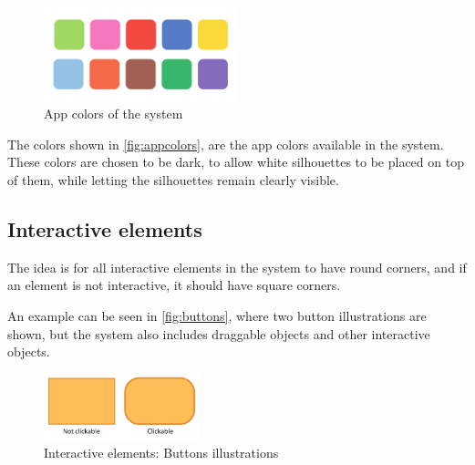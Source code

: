 \begin{figure}[h!]
	\centering
	\includegraphics[width=0.5\textwidth]{gfx/app_colors.pdf}
	\caption{App colors of the \giraf[] system}
	\label{fig:appcolors}
\end{figure}

The colors shown in \autoref{fig:appcolors}, are the app colors available in the \giraf[] system.
These colors are chosen to be dark, to allow white silhouettes to be placed on top of them, while letting the silhouettes remain clearly visible.

\subsection*{Interactive elements}
\label{design:button_design}

The idea is for all interactive elements in the \giraf[] system to have round corners, and if an element is not interactive, it should have square corners.

An example can be seen in \autoref{fig:buttons}, where two button illustrations are shown, but the system also includes draggable objects and other interactive objects.

\begin{figure}[h!]
	\centering
	\includegraphics[width=0.4\textwidth]{gfx/buttons.pdf}
	\caption{Interactive elements: Buttons illustrations}
	\label{fig:buttons}
\end{figure}